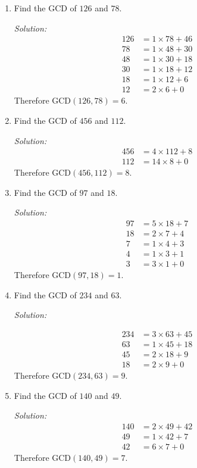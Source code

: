 \documentclass[16pt]{article}
\theoremstyle{remark}
\begin{document}
\begin{enumerate}
\item Find the GCD of $126$ and $78$.
\begin{mdframed}[style=TheoremFrame]
\textit{Solution:}
\begin{align*}
126 &= 1\times 78 + 46\\
78 &= 1 \times 48 + 30\\
48 &= 1 \times 30 + 18\\
30 &= 1 \times 18 + 12\\
18 &= 1 \times 12 + 6\\
12 &= 2 \times 6 + 0
\end{align*}
Therefore GCD$(126,78)=6$.
\end{mdframed}
\item Find the GCD of $456$ and $112$.
\begin{mdframed}[style=TheoremFrame]
\textit{Solution:}
\begin{align*}
456 &= 4 \times 112 + 8\\
112 &= 14 \times 8 + 0
\end{align*}
Therefore GCD$(456,112)=8$.
\end{mdframed}
\newpage
\item Find the GCD of $97$ and $18$.
\begin{mdframed}[style=TheoremFrame]
\textit{Solution:}
\begin{align*}
97&=5 \times 18+7\\
18 &= 2 \times 7 + 4\\
7 &= 1 \times 4 + 3\\
4 &= 1 \times 3 + 1\\
3 &= 3 \times 1 + 0
\end{align*}
Therefore GCD$(97,18)=1$.
\end{mdframed}
\item Find the GCD of $234$ and $63$.
\begin{mdframed}[style=TheoremFrame]
\textit{Solution:}

\begin{align*}
234 &= 3 \times 63 + 45\\
63 &= 1 \times 45 + 18\\
45 &= 2 \times 18 + 9\\
18 &= 2 \times 9 + 0
\end{align*}
Therefore GCD$(234,63)=9$.
\end{mdframed}
\item Find the GCD of $140$ and $49$.
\begin{mdframed}[style=TheoremFrame]
\textit{Solution:}
\begin{align*}
140 &= 2 \times 49 + 42\\
49 &= 1 \times 42+7\\
42 &= 6\times 7 + 0
\end{align*}
Therefore GCD$(140,49)=7$.
\end{mdframed}
\end{enumerate}
\end{document}

